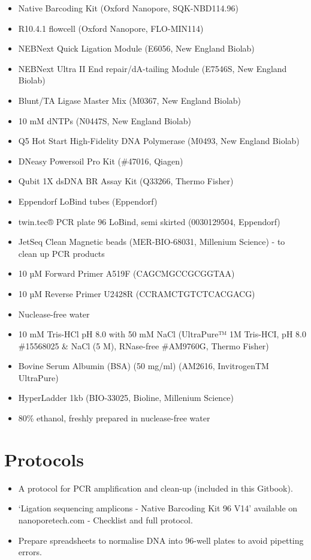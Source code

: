 \documentclass[
]{book}
\providecommand{\tightlist}{%
  \setlength{\itemsep}{0pt}\setlength{\parskip}{0pt}}
\begin{document}
\begin{itemize}
\tightlist
\item
  Native Barcoding Kit (Oxford Nanopore, SQK-NBD114.96)\\
\item
  R10.4.1 flowcell (Oxford Nanopore, FLO-MIN114)
\item
  NEBNext Quick Ligation Module (E6056, New England Biolab)
\item
  NEBNext Ultra II End repair/dA-tailing Module (E7546S, New England Biolab)
\item
  Blunt/TA Ligase Master Mix (M0367, New England Biolab)
\item
  10 mM dNTPs (N0447S, New England Biolab)
\item
  Q5 Hot Start High-Fidelity DNA Polymerase (M0493, New England Biolab)
\item
  DNeasy Powersoil Pro Kit (\#47016, Qiagen)
\item
  Qubit 1X dsDNA BR Assay Kit (Q33266, Thermo Fisher)
\item
  Eppendorf LoBind tubes (Eppendorf)
\item
  twin.tec® PCR plate 96 LoBind, semi skirted (0030129504, Eppendorf)
\item
  JetSeq Clean Magnetic beads (MER-BIO-68031, Millenium Science) - to clean up PCR products
\item
  10 µM Forward Primer A519F (CAGCMGCCGCGGTAA) \citep{Martijn2019}
\item
  10 µM Reverse Primer U2428R (CCRAMCTGTCTCACGACG) \citep{Martijn2019}
\item
  Nuclease-free water
\item
  10 mM Tris-HCl pH 8.0 with 50 mM NaCl (UltraPure™ 1M Tris-HCI, pH 8.0 \#15568025 \& NaCl (5 M), RNase-free \#AM9760G, Thermo Fisher)
\item
  Bovine Serum Albumin (BSA) (50 mg/ml) (AM2616, InvitrogenTM UltraPure)
\item
  HyperLadder 1kb (BIO-33025, Bioline, Millenium Science)
\item
  80\% ethanol, freshly prepared in nuclease-free water
\end{itemize}

\section{Protocols}\label{protocols}

\begin{itemize}
\tightlist
\item
  A protocol for PCR amplification and clean-up (included in this Gitbook).
\item
  `Ligation sequencing amplicons - Native Barcoding Kit 96 V14' available on nanoporetech.com - Checklist and full protocol.
\item
  Prepare spreadsheets to normalise DNA into 96-well plates to avoid pipetting errors.
\end{itemize}
\end{document}
